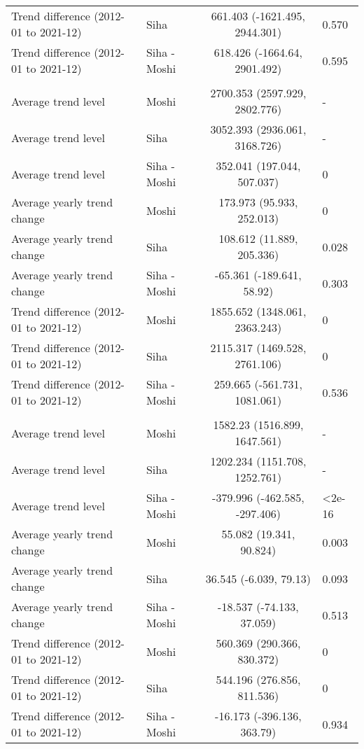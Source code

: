 \begin{longtable}{l|lcl}
Trend difference (2012-01 to 2021-12) & Siha & 661.403 (-1621.495, 2944.301) & 0.570 \\ 
Trend difference (2012-01 to 2021-12) & Siha - Moshi & 618.426 (-1664.64, 2901.492) & 0.595 \\ 
\midrule\addlinespace[2.5pt]
\multicolumn{4}{l}{Upper Respiratory Infections} \\ 
\midrule\addlinespace[2.5pt]
Average trend level & Moshi & 2700.353 (2597.929, 2802.776) & - \\ 
Average trend level & Siha & 3052.393 (2936.061, 3168.726) & - \\ 
Average trend level & Siha - Moshi & 352.041 (197.044, 507.037) & 0 \\ 
Average yearly trend change & Moshi & 173.973 (95.933, 252.013) & 0 \\ 
Average yearly trend change & Siha & 108.612 (11.889, 205.336) & 0.028 \\ 
Average yearly trend change & Siha - Moshi & -65.361 (-189.641, 58.92) & 0.303 \\ 
Trend difference (2012-01 to 2021-12) & Moshi & 1855.652 (1348.061, 2363.243) & 0 \\ 
Trend difference (2012-01 to 2021-12) & Siha & 2115.317 (1469.528, 2761.106) & 0 \\ 
Trend difference (2012-01 to 2021-12) & Siha - Moshi & 259.665 (-561.731, 1081.061) & 0.536 \\ 
\midrule\addlinespace[2.5pt]
\multicolumn{4}{l}{Urinary Tract Infections} \\ 
\midrule\addlinespace[2.5pt]
Average trend level & Moshi & 1582.23 (1516.899, 1647.561) & - \\ 
Average trend level & Siha & 1202.234 (1151.708, 1252.761) & - \\ 
Average trend level & Siha - Moshi & -379.996 (-462.585, -297.406) & <2e-16 \\ 
Average yearly trend change & Moshi & 55.082 (19.341, 90.824) & 0.003 \\ 
Average yearly trend change & Siha & 36.545 (-6.039, 79.13) & 0.093 \\ 
Average yearly trend change & Siha - Moshi & -18.537 (-74.133, 37.059) & 0.513 \\ 
Trend difference (2012-01 to 2021-12) & Moshi & 560.369 (290.366, 830.372) & 0 \\ 
Trend difference (2012-01 to 2021-12) & Siha & 544.196 (276.856, 811.536) & 0 \\ 
Trend difference (2012-01 to 2021-12) & Siha - Moshi & -16.173 (-396.136, 363.79) & 0.934 \\ 

\end{longtable}
